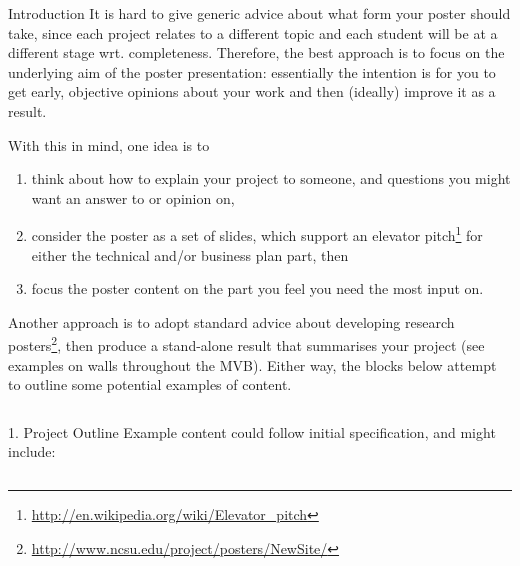 \documentclass[ %
                    author={Daniel Page},
                supervisor={Dr. Andrew Calway},
                    degree={MEng},
                     title={Some Structural Guidelines for CS MEng Posters},
                  subtitle={},
                      type={enterprise},
                      year={2014} ]{poster}
\begin{document}

\begin{frame}{} 

\vfill

\begin{columns}[t]
  \begin{column}{0.900\linewidth}
  \begin{block}{\Large Introduction}
  It is hard to give generic advice about what form your poster should 
  take, since each project relates to a different topic and each student
  will be at a different stage wrt. completeness.  Therefore, the best 
  approach is to focus on the underlying aim of the poster presentation:
  essentially the intention is for you to get early, objective opinions
  about your work and then (ideally) improve it as a result.

  With this in mind, one idea is to

  \begin{enumerate}
  \item think about how to explain your project to someone, and questions
        you might want an answer to or opinion on,
  \item consider the poster as a set of slides, which support an elevator
        pitch\footnote{\url{http://en.wikipedia.org/wiki/Elevator_pitch}}
        for either the technical and/or business plan part,
        then
  \item focus the poster content on the part you feel you need the most
        input on.
  \end{enumerate}

  \noindent
  Another approach is to adopt standard advice about developing research 
  posters\footnote{\url{http://www.ncsu.edu/project/posters/NewSite/}}, 
  then produce a stand-alone result that summarises your project (see
  examples on walls throughout the MVB).  Either way, the blocks below 
  attempt to outline some potential examples of content.
  \end{block}
  \end{column}
\end{columns}

\vfill

\begin{columns}[t]
  \begin{column}{0.422\linewidth}
  \begin{block}{\Large 1. Project Outline}
  Example content could follow initial specification, and might include:


\end{block}
\end{column}
\end{columns}
\end{frame}
\end{document}
